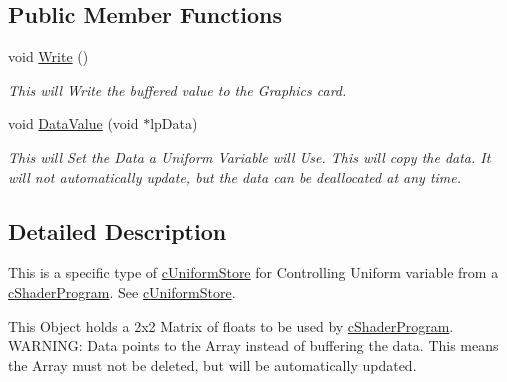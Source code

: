 \subsection*{Public Member Functions}
\begin{DoxyCompactItemize}
\item 
\hypertarget{classc_uniform_matrix2_a10a57f7b856f2883fc8e31e3730cff04}{
void \hyperlink{classc_uniform_matrix2_a10a57f7b856f2883fc8e31e3730cff04}{Write} ()}
\label{classc_uniform_matrix2_a10a57f7b856f2883fc8e31e3730cff04}

\begin{DoxyCompactList}\small\item\em This will Write the buffered value to the Graphics card. \end{DoxyCompactList}\item 
\hypertarget{classc_uniform_matrix2_a3dc883ced4979df51a043331c3ec7bbd}{
void \hyperlink{classc_uniform_matrix2_a3dc883ced4979df51a043331c3ec7bbd}{DataValue} (void $\ast$lpData)}
\label{classc_uniform_matrix2_a3dc883ced4979df51a043331c3ec7bbd}

\begin{DoxyCompactList}\small\item\em This will Set the Data a Uniform Variable will Use. This will copy the data. It will not automatically update, but the data can be deallocated at any time. \end{DoxyCompactList}\end{DoxyCompactItemize}


\subsection{Detailed Description}
This is a specific type of \hyperlink{classc_uniform_store}{cUniformStore} for Controlling Uniform variable from a \hyperlink{classc_shader_program}{cShaderProgram}. See \hyperlink{classc_uniform_store}{cUniformStore}. 

This Object holds a 2x2 Matrix of floats to be used by \hyperlink{classc_shader_program}{cShaderProgram}. WARNING: Data points to the Array instead of buffering the data. This means the Array must not be deleted, but will be automatically updated. 